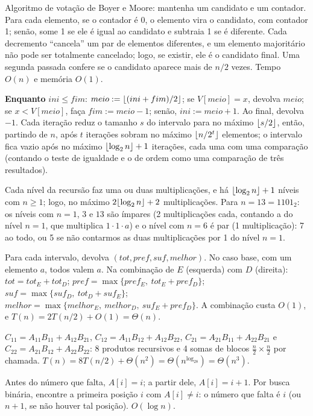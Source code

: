  Algoritmo de votação de Boyer e Moore: mantenha um candidato e um contador. Para cada elemento, se o contador é 0, o elemento vira o candidato, com contador 1; senão, some 1 se ele é igual ao candidato e subtraia 1 se é diferente. Cada decremento ``cancela'' um par de elementos diferentes, e um elemento majoritário não pode ser totalmente cancelado; logo, se existir, ele é o candidato final. Uma segunda passada confere se o candidato aparece mais de $n/2$ vezes. Tempo $O(n)$ e memória $O(1)$.

 \textbf{Enquanto} $ini\le fim$: $meio:=\lfloor(ini+fim)/2\rfloor$; se $V[meio]=x$, devolva $meio$; se $x<V[meio]$, faça $fim:=meio-1$; senão, $ini:=meio+1$. Ao final, devolva $-1$. Cada iteração reduz o tamanho $s$ do intervalo para no máximo $\lfloor s/2\rfloor$, então, partindo de $n$, após $t$ iterações sobram no máximo $\lfloor n/2^t\rfloor$ elementos; o intervalo fica vazio após no máximo $\lfloor\log_2n\rfloor+1$ iterações, cada uma com uma comparação (contando o teste de igualdade e o de ordem como uma comparação de três resultados).

 Cada nível da recursão faz uma ou duas multiplicações, e há $\lfloor\log_2n\rfloor+1$ níveis com $n\ge1$; logo, no máximo $2\lfloor\log_2n\rfloor+2$ multiplicações. Para $n=13=1101_2$: os níveis com $n=1$, $3$ e $13$ são ímpares (2 multiplicações cada, contando a do nível $n=1$, que multiplica $1\cdot1\cdot a$) e o nível com $n=6$ é par (1 multiplicação): 7 ao todo, ou 5 se não contarmos as duas multiplicações por 1 do nível $n=1$.

 Para cada intervalo, devolva $(tot,pref,suf,melhor)$. No caso base, com um elemento $a$, todos valem $a$. Na combinação de $E$ (esquerda) com $D$ (direita): $tot=tot_E+tot_D$; $pref=\max\{pref_E,\ tot_E+pref_D\}$; $suf=\max\{suf_D,\ tot_D+suf_E\}$; $melhor=\max\{melhor_E,\ melhor_D,\ suf_E+pref_D\}$. A combinação custa $O(1)$, e $T(n)=2T(n/2)+O(1)=\Theta(n)$.

 $C_{11}=A_{11}B_{11}+A_{12}B_{21}$, $C_{12}=A_{11}B_{12}+A_{12}B_{22}$, $C_{21}=A_{21}B_{11}+A_{22}B_{21}$ e $C_{22}=A_{21}B_{12}+A_{22}B_{22}$: 8 produtos recursivos e 4 somas de blocos $\frac n2\times\frac n2$ por chamada. $T(n)=8T(n/2)+\Theta(n^2)=\Theta(n^{\log_28})=\Theta(n^3)$.

 Antes do número que falta, $A[i]=i$; a partir dele, $A[i]=i+1$. Por busca binária, encontre a primeira posição $i$ com $A[i]\ne i$: o número que falta é $i$ (ou $n+1$, se não houver tal posição). $O(\log n)$.

